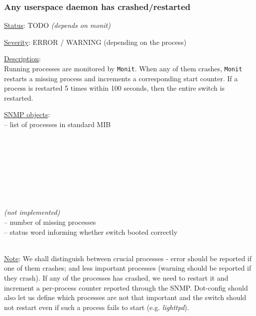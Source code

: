 \subsubsection{\bf Any userspace daemon has crashed/restarted}
		\label{fail:other:daemon_crash}
		\begin{pck_descr}
			\item [] \underline{Status}: TODO \emph{(depends on monit)}
			\item [] \underline{Severity}: ERROR / WARNING (depending on the process)
			\item [] \underline{Description}:\\
				Running processes are monitored by \texttt{Monit}. When any of them
				crashes, \texttt{Monit} restarts a missing process and increments a
				corresponding start counter. If a process is restarted 5 times within
				100 seconds, then the entire switch is restarted.
			\item [] \underline{SNMP objects}:\\
        {\footnotesize
				 -- list of processes in standard MIB\\
				\\
				\\
				\\
				\\
				\\
				\\
				\\
				\\
				 \emph{(not implemented)}\\
				 -- number of missing processes\\
				 -- status word informing whether switch booted correctly\\
				\\
         }
			\item [] \underline{Note}: We shall distinguish between crucial
				processes - error should be reported if one of them crashes; and less
				important processes (warning should be reported if they crash). If any
				of the processes has crashed, we need to restart it and increment a
				per-process counter reported through the SNMP. Dot-config should also
        let us define which processes are not that important and the switch
        should not restart even if such a process fails to start (e.g.
        \emph{lighttpd}).


\end{pck_descr}
